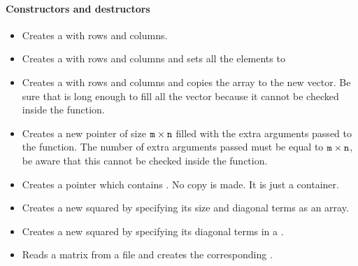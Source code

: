 \paragraph{Constructors and destructors}
\begin{itemize}
\item {}
  \sshortdescribe Creates a   with  rows and  columns.

\item {}
  \sshortdescribe Creates a  with  rows and 
  columns and sets all the elements to 

\item {}
  \sshortdescribe Creates a  with  rows and 
  columns and copies the array  to the new vector. Be sure that 
  is long enough to fill all the vector because it cannot be checked inside the function.

\item {}
  \sshortdescribe Creates a new  pointer of size ${\tt m
    \times n}$ filled with the extra arguments passed to the function. The
  number of extra arguments passed must be equal to ${\tt m \times n}$, be
  aware that this cannot be checked inside the function.

\item {}
  \sshortdescribe Creates a  pointer which contains
  . No copy is made. It is just a container.
  
\item {}
  \sshortdescribe Creates a new squared  by specifying its size and
  diagonal terms as an array.

\item {}
  \sshortdescribe Creates a new squared  by specifying its diagonal
  terms in a .

\item {}
  \sshortdescribe Reads a matrix from a file and creates the corresponding .  


\end{itemize}
